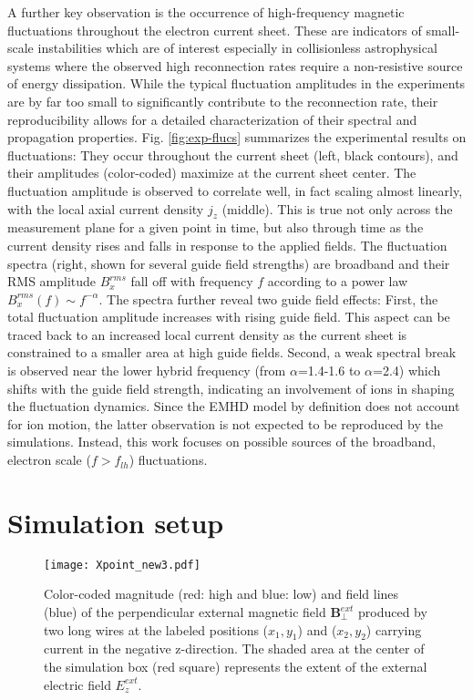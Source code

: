 \documentclass[aip,preprint]{revtex4-1}
\begin{document}
A further key observation is the occurrence of high-frequency magnetic fluctuations throughout the electron current sheet. These are indicators of small-scale instabilities which are of interest especially in collisionless astrophysical systems where the  observed high reconnection rates require a non-resistive source of energy dissipation. While the typical fluctuation amplitudes in the experiments are by far too small to significantly contribute to the reconnection rate, their reproducibility allows for a detailed characterization of their spectral and propagation properties. Fig. \ref{fig:exp-flucs} summarizes the experimental results on fluctuations:
They occur throughout the current sheet (left, black contours), and their amplitudes (color-coded) maximize at the current sheet center. The fluctuation amplitude is observed to correlate well, in fact scaling almost linearly, with the local axial current density $j_z$ (middle). This is true not only across the measurement plane for a given point in time, but also through time as the current density rises and falls in response to the applied fields. The fluctuation spectra (right, shown for several guide field strengths) are broadband and their RMS amplitude $B_x^{rms}$  fall off with frequency $f$ according to a power law $B_x^{rms}(f)\sim f^{-\alpha}$. The spectra further reveal two guide field effects: First, the total fluctuation amplitude increases with rising guide field. This aspect can be traced back to an increased local current density as the current sheet is constrained to a smaller area at high guide fields. Second, a weak spectral break is observed near the lower hybrid frequency
(from $\alpha$=1.4-1.6 to $\alpha$=2.4) which shifts with the guide field strength, indicating an involvement of ions in shaping the fluctuation dynamics.
Since the EMHD model by definition does not account for ion motion, the latter observation is not expected to be reproduced by the simulations. Instead, this work focuses on possible sources of the broadband, electron scale ($f>f_{lh}$) fluctuations.

\section{Simulation setup \label{sec:simu_setup}}
\begin{figure}[h]
\texttt{[image: Xpoint\_new3.pdf]}
\caption{Color-coded magnitude (red: high and blue: low) and field lines (blue) of the perpendicular external magnetic field $\mathbf{B}_{\perp}^{ext}$ produced by  two long wires at the labeled positions ($x_1,y_1$) and ($x_2,y_2$) carrying current in the negative z-direction. The shaded area at the center of the simulation box (red square) represents the extent of the external electric field $E_z^{ext}$. }
\label{fig:x-point}
\end{figure}
\end{document}
